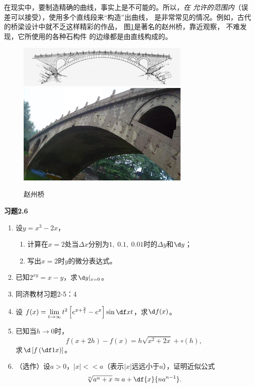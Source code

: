 \bs
在现实中，要制造精确的曲线，事实上是不可能的。所以，{\it 在
允许的范围内}（误差可以接受），使用多个直线段来“构造”出曲线，
是非常常见的情况。例如，古代的桥梁设计中就不乏这样精彩的作品，
图\ref{fig:zhaozhouqiao}是著名的赵州桥，靠近观察，
不难发现，它所使用的各种石构件
的边缘都是由直线构成的。

\begin{figure}[h]
	\centering
	\includegraphics[width=0.75\textwidth]{./Images/Ch02/archBridge-1.jpg}\\
	\includegraphics[width=0.75\textwidth]{./Images/Ch02/zhaozhouqiao.jpg}
	\caption{赵州桥}
	\label{fig:zhaozhouqiao}
\end{figure}

\begin{ext}
	{\centering\bf 习题2.6}
	
	\begin{enumerate}  
	  \item 设$y=x^3-2x$，
	  \begin{enumerate}[(1)]
	    \item 计算在$x=2$处当$\Delta x$分别为$1,\;0.1,\;
	  	0.01$时的$\Delta y$和$\d y$；
	    \item 写出$x=2$时$y$的微分表达式。
	  \end{enumerate}
	  \item 已知$2^{xy}=x-y$，求$\d y|_{x=0}$。
	  \item 同济教材习题2-5：4
	  \item 设
	  $f(x)=\lim\limits_{t\to\infty}t^2
	  \left[e^{x+\frac2t}-e^x\right]\sin\df xt$，求$\d f(x)$。
	  \item 已知当$h\to 0$时，
	  $$f(x+2h)-f(x)=h\sqrt{x^2+2x}+\circ(h),$$
	  求$\d\left[f\left(\df1x\right)\right]$。
	  \item （选作）设$a>0$，$|x|<<a$（表示$|x|$远远小于$a$），证明近似公式
	  $$\sqrt[n]{a^n+x}\approx a+\df{x}{na^{n-1}}.$$
	\end{enumerate}
\end{ext}

